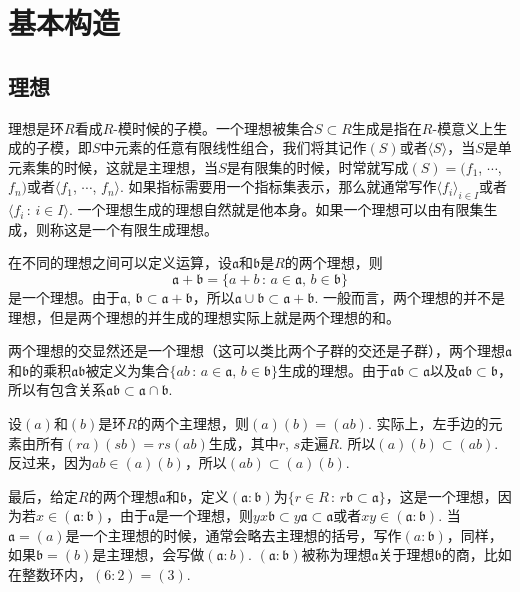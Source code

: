 \chapter{基本构造}

\section{理想}

\para[理想] 理想是环$R$看成$R$-模时候的子模。一个理想被集合$S\subset R$生成是指在$R$-模意义上生成的子模，即$S$中元素的任意有限线性组合，我们将其记作$(S)$或者$\langle S\rangle$，当$S$是单元素集的时候，这就是主理想，当$S$是有限集的时候，时常就写成$(S)=(f_1$, $\cdots$, $f_n)$或者$\langle f_1$, $\cdots$, $f_n\rangle$. 如果指标需要用一个指标集表示，那么就通常写作$\langle f_i\rangle_{i\in I}$或者$\langle f_i\,:\,i\in I\rangle$. 一个理想生成的理想自然就是他本身。如果一个理想可以由有限集生成，则称这是一个有限生成理想。\endpara

\para[理想的运算] 在不同的理想之间可以定义运算，设$\mathfrak{a}$和$\mathfrak{b}$是$R$的两个理想，则
\[
\mathfrak{a}+\mathfrak{b}=\{a+b\,:\,a\in\mathfrak{a},\,b\in\mathfrak{b}\}
\]
是一个理想。由于$\mathfrak{a}$, $\mathfrak{b}\subset \mathfrak{a}+\mathfrak{b}$，所以$\mathfrak{a}\cup\mathfrak{b}\subset \mathfrak{a}+\mathfrak{b}$. 一般而言，两个理想的并不是理想，但是两个理想的并生成的理想实际上就是两个理想的和。

两个理想的交显然还是一个理想（这可以类比两个子群的交还是子群），两个理想$\mathfrak{a}$和$\mathfrak{b}$的乘积$\mathfrak{a}\mathfrak{b}$被定义为集合$\{ab\,:\,a\in\mathfrak{a},\,b\in\mathfrak{b}\}$生成的理想。由于$\mathfrak{a}\mathfrak{b}\subset \mathfrak{a}$以及$\mathfrak{a}\mathfrak{b}\subset \mathfrak{b}$，所以有包含关系$\mathfrak{a}\mathfrak{b}\subset \mathfrak{a}\cap \mathfrak{b}$.

设$(a)$和$(b)$是环$R$的两个主理想，则$(a)(b)=(ab)$. 实际上，左手边的元素由所有$(ra)(sb)=rs(ab)$生成，其中$r$, $s$走遍$R$. 所以$(a)(b)\subset (ab)$. 反过来，因为$ab\in (a)(b)$，所以$(ab)\subset (a)(b)$.

最后，给定$R$的两个理想$\mathfrak{a}$和$\mathfrak{b}$，定义$(\mathfrak{a}:\mathfrak{b})$为$\{r\in R\,:\, r\mathfrak{b}\subset \mathfrak{a}\}$，这是一个理想，因为若$x\in (\mathfrak{a}:\mathfrak{b})$，由于$\mathfrak{a}$是一个理想，则$yx\mathfrak{b}\subset y\mathfrak{a}\subset \mathfrak{a}$或者$xy\in (\mathfrak{a}:\mathfrak{b})$. 当$\mathfrak{a}=(a)$是一个主理想的时候，通常会略去主理想的括号，写作$(a:\mathfrak{b})$，同样，如果$\mathfrak{b}=(b)$是主理想，会写做$(\mathfrak{a}:b)$. $(\mathfrak{a}:\mathfrak{b})$被称为理想$\mathfrak{a}$关于理想$\mathfrak{b}$的商，比如在整数环内，$(6:2)=(3)$.
\endpara

